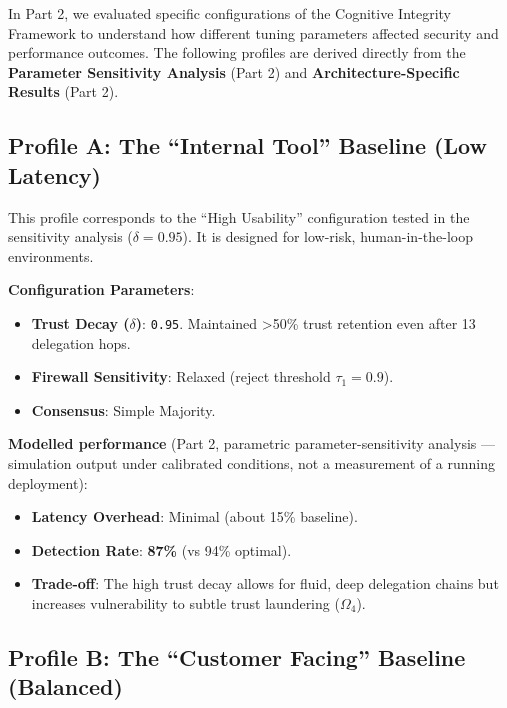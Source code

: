 \documentclass[
]{article}
\providecommand{\tightlist}{%
  \setlength{\itemsep}{0pt}\setlength{\parskip}{0pt}}
\begin{document}
In Part 2, we evaluated specific configurations of the Cognitive
Integrity Framework to understand how different tuning parameters
affected security and performance outcomes. The following profiles are
derived directly from the \textbf{Parameter Sensitivity Analysis} (Part
2) and \textbf{Architecture-Specific Results} (Part 2).

\subsection{Profile A: The ``Internal Tool'' Baseline (Low
Latency)}\label{profile-a-the-internal-tool-baseline-low-latency}

This profile corresponds to the ``High Usability'' configuration tested
in the sensitivity analysis (\(\delta=0.95\)). It is designed for
low-risk, human-in-the-loop environments.

\textbf{Configuration Parameters}:

\begin{itemize}
\tightlist
\item
  \textbf{Trust Decay (\(\delta\))}: \texttt{0.95}. Maintained
  \textgreater50\% trust retention even after 13 delegation hops.
\item
  \textbf{Firewall Sensitivity}: Relaxed (reject threshold
  \(\tau_1 =0.9\)).
\item
  \textbf{Consensus}: Simple Majority.
\end{itemize}

\textbf{Modelled performance} (Part 2, parametric parameter-sensitivity
analysis --- simulation output under calibrated conditions, not a
measurement of a running deployment):

\begin{itemize}
\tightlist
\item
  \textbf{Latency Overhead}: Minimal (about 15\% baseline).
\item
  \textbf{Detection Rate}: \textbf{87\%} (vs 94\% optimal).
\item
  \textbf{Trade-off}: The high trust decay allows for fluid, deep
  delegation chains but increases vulnerability to subtle trust
  laundering (\(\Omega_4\)).
\end{itemize}

\subsection{Profile B: The ``Customer Facing'' Baseline
(Balanced)}\label{profile-b-the-customer-facing-baseline-balanced}
\end{document}
